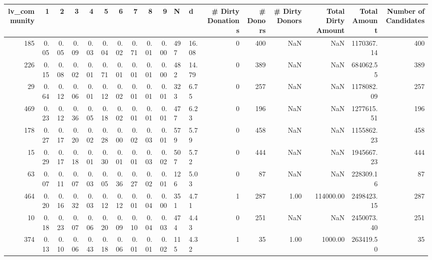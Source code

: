 \begin{tabular}{rrrrrrrrrrllrrrrrr}
\toprule
 lv\_community &    1 &    2 &    3 &    4 &    5 &    6 &    7 &    8 &    9 &   N &     d &  \# Dirty Donations &  \# Donors &  \# Dirty Donors &  Total Dirty Amount &  Total Amount &  Number of Candidates \\
\midrule
          185 & 0.05 & 0.05 & 0.09 & 0.03 & 0.04 & 0.02 & 0.71 & 0.01 & 0.00 & 497 & 16.08 &                  0 &       400 &             NaN &                 NaN &    1170367.14 &                   400 \\
          226 & 0.15 & 0.08 & 0.02 & 0.01 & 0.71 & 0.01 & 0.01 & 0.01 & 0.00 & 482 & 14.79 &                  0 &       389 &             NaN &                 NaN &     684062.55 &                   389 \\
           29 & 0.64 & 0.12 & 0.06 & 0.01 & 0.12 & 0.02 & 0.01 & 0.01 & 0.01 & 323 &  6.75 &                  0 &       257 &             NaN &                 NaN &    1178082.09 &                   257 \\
          469 & 0.23 & 0.12 & 0.36 & 0.05 & 0.18 & 0.02 & 0.01 & 0.01 & 0.01 & 477 &  6.23 &                  0 &       196 &             NaN &                 NaN &    1277615.51 &                   196 \\
          178 & 0.27 & 0.17 & 0.20 & 0.02 & 0.28 & 0.00 & 0.02 & 0.03 & 0.01 & 579 &  5.79 &                  0 &       458 &             NaN &                 NaN &    1155862.23 &                   458 \\
           15 & 0.29 & 0.17 & 0.18 & 0.01 & 0.30 & 0.01 & 0.01 & 0.03 & 0.02 & 507 &  5.72 &                  0 &       444 &             NaN &                 NaN &    1945667.23 &                   444 \\
           63 & 0.07 & 0.11 & 0.07 & 0.03 & 0.05 & 0.36 & 0.27 & 0.02 & 0.01 & 126 &  5.03 &                  0 &        87 &             NaN &                 NaN &     228309.16 &                    87 \\
          464 & 0.20 & 0.16 & 0.32 & 0.03 & 0.12 & 0.12 & 0.01 & 0.04 & 0.00 & 351 &  4.71 &                  1 &       287 &            1.00 &           114000.00 &    2498423.15 &                   287 \\
           10 & 0.18 & 0.23 & 0.07 & 0.06 & 0.20 & 0.09 & 0.10 & 0.04 & 0.03 & 474 &  4.43 &                  0 &       251 &             NaN &                 NaN &    2450073.40 &                   251 \\
          374 & 0.13 & 0.10 & 0.06 & 0.43 & 0.18 & 0.06 & 0.01 & 0.01 & 0.02 & 115 &  4.32 &                  1 &        35 &            1.00 &             1000.00 &     263419.50 &                    35 \\

\end{tabular}
